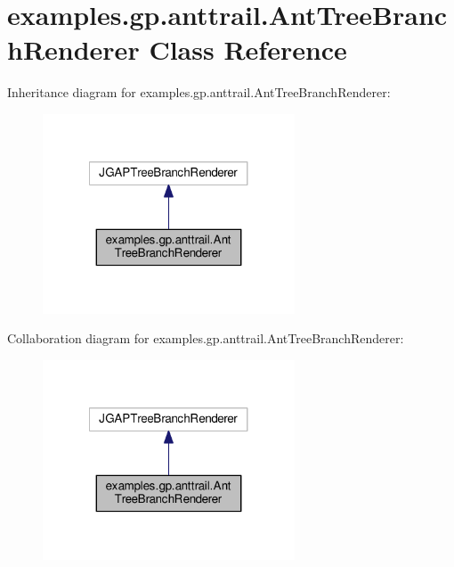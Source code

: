\hypertarget{classexamples_1_1gp_1_1anttrail_1_1_ant_tree_branch_renderer}{\section{examples.\-gp.\-anttrail.\-Ant\-Tree\-Branch\-Renderer Class Reference}
\label{classexamples_1_1gp_1_1anttrail_1_1_ant_tree_branch_renderer}
}


Inheritance diagram for examples.\-gp.\-anttrail.\-Ant\-Tree\-Branch\-Renderer\-:
\nopagebreak
\begin{figure}[H]
\begin{center}
\leavevmode
\includegraphics[width=212pt]{classexamples_1_1gp_1_1anttrail_1_1_ant_tree_branch_renderer__inherit__graph}
\end{center}
\end{figure}


Collaboration diagram for examples.\-gp.\-anttrail.\-Ant\-Tree\-Branch\-Renderer\-:
\nopagebreak
\begin{figure}[H]
\begin{center}
\leavevmode
\includegraphics[width=212pt]{classexamples_1_1gp_1_1anttrail_1_1_ant_tree_branch_renderer__coll__graph}
\end{center}
\end{figure}
